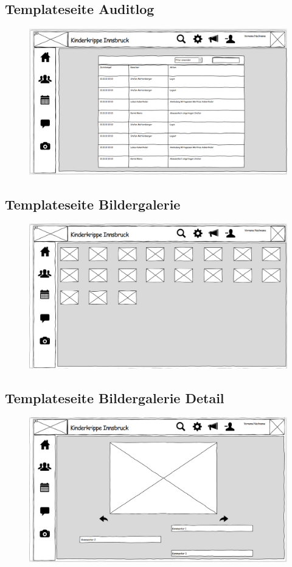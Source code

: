   \subsection{Templateseite Auditlog}
 \begin{figure}[ht!]
  \includegraphics[width = 150mm]{pictures/Auditlog.PNG}
 \end{figure}
 
  \newpage
 \subsection{Templateseite Bildergalerie}
 \begin{figure}[ht!]
  \includegraphics[width = 150mm]{pictures/Bildergalerie.PNG}
 \end{figure}
 
  \subsection{Templateseite Bildergalerie Detail}
 \begin{figure}[ht!]
  \includegraphics[width = 150mm]{pictures/Bildergalerie_detail.PNG}
 \end{figure}
 
